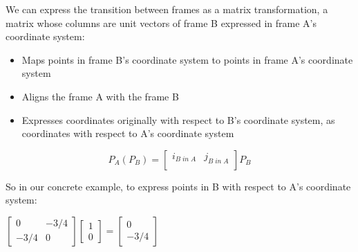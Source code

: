 \documentclass{article}
\begin{document}
{    We can express the transition between frames as a matrix transformation, a matrix whose columns are unit vectors of frame B expressed in frame A's coordinate system:
    \begin{itemize}
        \item Maps points in frame B's coordinate system to points in frame A's coordinate system
        \item Aligns the frame A with the frame B
        \item Expresses coordinates originally with respect to B's coordinate system, as coordinates with respect to A's coordinate system
    \end{itemize}

    \begin{equation}
        P_{A}(P_{B})=
        \begin{bmatrix}
            i_{B \; in \; A} & j_{B \; in \; A} \\
        \end{bmatrix}
        P_{B}
    \end{equation}

    So in our concrete example, to express points in B with respect to A's coordinate system:

     $\begin{bmatrix}
        0 & -3/4 \\
        -3/4 & 0 
    \end{bmatrix}
    \begin{bmatrix}
        1 \\ 0
    \end{bmatrix}
    = 
    \begin{bmatrix}
        0\\-3/4 
    \end{bmatrix}
    $
}
\end{document}
